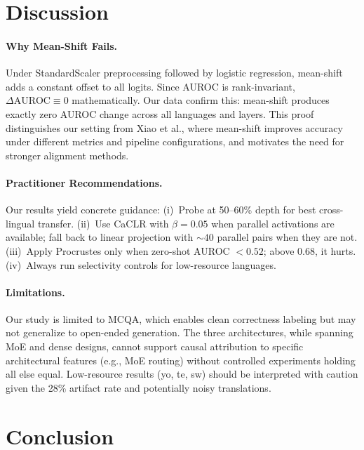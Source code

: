 \documentclass[11pt,a4paper]{article}
\newcommand{\caclr}{CaCLR}
\begin{document}
\section{Discussion}

\paragraph{Why Mean-Shift Fails.}
Under StandardScaler preprocessing followed by logistic regression, mean-shift adds a constant offset to all logits.
Since AUROC is rank-invariant, $\Delta\text{AUROC} \equiv 0$ mathematically.
Our data confirm this: mean-shift produces exactly zero AUROC change across all languages and layers.
This proof distinguishes our setting from Xiao et al., where mean-shift improves accuracy under different metrics and pipeline configurations, and motivates the need for stronger alignment methods.

\paragraph{Practitioner Recommendations.}
Our results yield concrete guidance:
(i)~Probe at 50--60\% depth for best cross-lingual transfer.
(ii)~Use \caclr{} with $\beta{=}0.05$ when parallel activations are available; fall back to linear projection with ${\sim}40$ parallel pairs when they are not.
(iii)~Apply Procrustes only when zero-shot AUROC $< 0.52$; above $0.68$, it hurts.
(iv)~Always run selectivity controls for low-resource languages.

\paragraph{Limitations.}
Our study is limited to MCQA, which enables clean correctness labeling but may not generalize to open-ended generation.
The three architectures, while spanning MoE and dense designs, cannot support causal attribution to specific architectural features (e.g., MoE routing) without controlled experiments holding all else equal.
Low-resource results (yo, te, sw) should be interpreted with caution given the 28\% artifact rate and potentially noisy translations.


\section{Conclusion}
\end{document}
